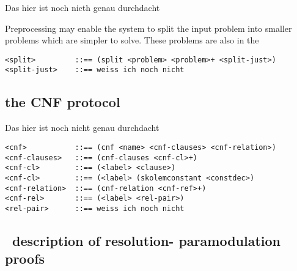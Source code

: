 {\sc Das hier ist noch nicth genau durchdacht}

Preprocessing may enable the system to split the input problem into smaller problems which are 
simpler to solve. These problems are also in the 
\begin{verbatim}
<split>         ::== (split <problem> <problem>+ <split-just>)
<split-just>    ::== weiss ich noch nicht
\end{verbatim}

\subsection{ the CNF protocol}

{\sc Das hier ist noch nicht genau durchdacht}
\begin{verbatim}
<cnf>           ::== (cnf <name> <cnf-clauses> <cnf-relation>)
<cnf-clauses>   ::== (cnf-clauses <cnf-cl>+)
<cnf-cl>        ::== (<label> <clause>)
<cnf-cl>        ::== (<label> (skolemconstant <constdec>)
<cnf-relation>  ::== (cnf-relation <cnf-ref>+)
<cnf-rel>       ::== (<label> <rel-pair>)
<rel-pair>      ::== weiss ich noch nicht
\end{verbatim}

\subsection{\post\ description of resolution- paramodulation proofs}

